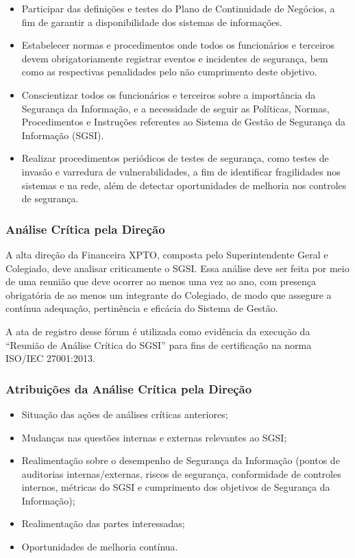 \documentclass[a4paper,12pt]{article}
\begin{document}
\begin{itemize}
    \item Participar das definições e testes do Plano de Continuidade de Negócios, a fim de garantir a disponibilidade dos sistemas de informações.
    \item Estabelecer normas e procedimentos onde todos os funcionários e terceiros devem obrigatoriamente registrar eventos e incidentes de segurança, bem como as respectivas penalidades pelo não cumprimento deste objetivo.
    \item Conscientizar todos os funcionários e terceiros sobre a importância da Segurança da Informação, e a necessidade de seguir as Políticas, Normas, Procedimentos e Instruções referentes ao Sistema de Gestão de Segurança da Informação (SGSI).
    \item Realizar procedimentos periódicos de testes de segurança, como testes de invasão e varredura de vulnerabilidades, a fim de identificar fragilidades nos sistemas e na rede, além de detectar oportunidades de melhoria nos controles de segurança.
\end{itemize}


\subsubsection{Análise Crítica pela Direção}

A alta direção da Financeira XPTO, composta pelo Superintendente Geral e Colegiado, deve analisar criticamente o SGSI. Essa análise deve ser feita por meio de uma reunião que deve ocorrer ao menos uma vez ao ano, com presença obrigatória de ao menos um integrante do Colegiado, de modo que assegure a contínua adequação, pertinência e eficácia do Sistema de Gestão.

A ata de registro desse fórum é utilizada como evidência da execução da “Reunião de Análise Crítica do SGSI” para fins de certificação na norma ISO/IEC 27001:2013.

\subsubsection{Atribuições da Análise Crítica pela Direção}

\begin{itemize}
    \item Situação das ações de análises críticas anteriores;
    \item Mudanças nas questões internas e externas relevantes ao SGSI;
    \item Realimentação sobre o desempenho de Segurança da Informação (pontos de auditorias internas/externas, riscos de segurança, conformidade de controles internos, métricas do SGSI e cumprimento dos objetivos de Segurança da Informação);
    \item Realimentação das partes interessadas;
    \item Oportunidades de melhoria contínua.
\end{itemize}
\end{document}
